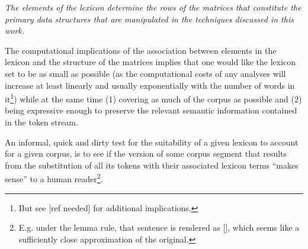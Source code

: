 \emph{
    The elements of the lexicon determine the rows of the matrices that constitute the primary data structures that are manipulated in the techniques discussed in this work.
}

The computational implications of the association between elements in the lexicon and the structure of the matrices implies that one would like the lexicon set to be as small as possible (as the computational costs of any analyses will increase at least linearly and usually exponentially with the number of words in it\footnote{
    But see [ref needed] for additional implications.
}) while at the same time (1) covering as much of the corpus as possible and (2) being expressive enough to preserve the relevant semantic information contained in the token stream.

An informal, quick and dirty test for the suitability of a given lexicon to account for a given corpus, is to see if the version of some corpus segment that results from the substitution of all its tokens with their associated lexicon terms ``makes sense'' to a human reader\footnote{
    E.g. under the lemma rule, that sentence is rendered as [], which seems like a sufficiently close approximation of the original.
}.

